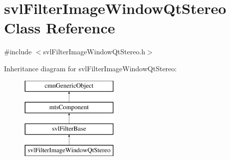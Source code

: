 \hypertarget{classsvl_filter_image_window_qt_stereo}{\section{svl\-Filter\-Image\-Window\-Qt\-Stereo Class Reference}
\label{classsvl_filter_image_window_qt_stereo}
}


{\ttfamily \#include $<$svl\-Filter\-Image\-Window\-Qt\-Stereo.\-h$>$}

Inheritance diagram for svl\-Filter\-Image\-Window\-Qt\-Stereo\-:\begin{figure}[H]
\begin{center}
\leavevmode
\includegraphics[height=4.000000cm]{df/dd3/classsvl_filter_image_window_qt_stereo}
\end{center}
\end{figure}
